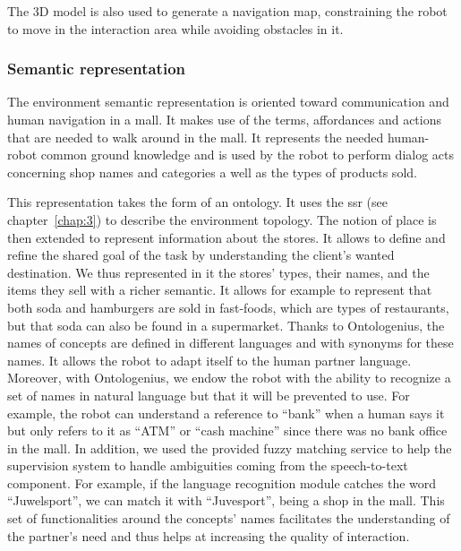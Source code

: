 The 3D model is also used to generate a navigation map, constraining the robot to move in the interaction area while avoiding obstacles in it.

\subsubsection{Semantic representation}

The environment semantic representation is oriented toward communication and human navigation in a mall. It makes use of the terms, affordances and actions that are needed to walk around in the mall. It represents the needed human-robot common ground knowledge and is used by the robot to perform dialog acts concerning shop names and categories a well as the types of products sold.

This representation takes the form of an ontology. It uses the \acrfull{ssr} (see chapter~\ref{chap:3}) to describe the environment topology. The notion of place is then extended to represent information about the stores. It allows to define and refine the shared goal of the task by understanding the client's wanted destination. We thus represented in it the stores' types, their names, and the items they sell with a richer semantic. It allows for example to represent that both soda and hamburgers are sold in fast-foods, which are types of restaurants, but that soda can also be found in a supermarket. Thanks to Ontologenius, the names of concepts are defined in different languages and with synonyms for these names. It allows the robot to adapt itself to the human partner language. Moreover, with Ontologenius, we endow the robot with the ability to recognize a set of names in natural language but that it will be prevented to use. For example, the robot can understand a reference to ``bank'' when a human says it but only refers to it as ``ATM'' or ``cash machine'' since there was no bank office in the mall. In addition, we used the provided fuzzy matching service to help the supervision system to handle ambiguities coming from the speech-to-text component. For example, if the language recognition module catches the word ``Juwelsport'', we can match it with ``Juvesport'', being a shop in the mall. This set of functionalities around the concepts' names facilitates the understanding of the partner's need and thus helps at increasing the quality of interaction.

